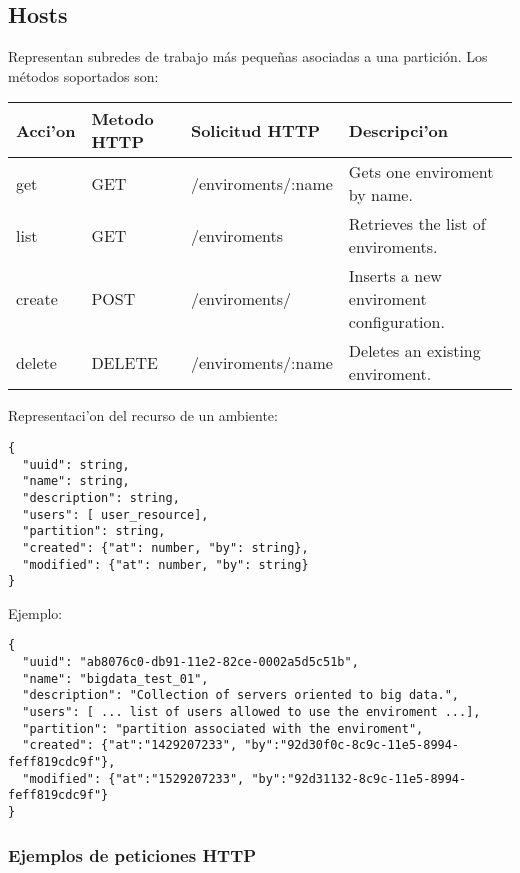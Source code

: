 \subsection{Hosts}
Representan subredes de trabajo más pequeñas asociadas a una partición. Los métodos soportados son:

\begin{center}
 \begin{tabular}{| l | l | l | l |}
 \hline
  \rowcolor{blueapi}
  \textbf{Acci'on} & \textbf{Metodo HTTP} & \textbf{Solicitud HTTP} & \textbf{Descripci'on} \\ [0.5ex] 
  \hline\hline
  get & GET & /enviroments/:name & Gets one enviroment by name. \\
  \hline
  list & GET & /enviroments & Retrieves the list of enviroments. \\
  \hline  
  create & POST & /enviroments/ & Inserts a new enviroment configuration. \\
  \hline
  delete & DELETE & /enviroments/:name & Deletes an existing enviroment. \\
  \hline
\end{tabular}
\end{center}

Representaci'on del recurso de un ambiente:

\medskip
\begin{lstlisting}[style=json]
{
  "uuid": string,
  "name": string,
  "description": string, 
  "users": [ user_resource],
  "partition": string,
  "created": {"at": number, "by": string},
  "modified": {"at": number, "by": string}
}
\end{lstlisting}

Ejemplo:

\medskip
\begin{lstlisting}[style=json]
{
  "uuid": "ab8076c0-db91-11e2-82ce-0002a5d5c51b",
  "name": "bigdata_test_01",
  "description": "Collection of servers oriented to big data.", 
  "users": [ ... list of users allowed to use the enviroment ...],
  "partition": "partition associated with the enviroment",
  "created": {"at":"1429207233", "by":"92d30f0c-8c9c-11e5-8994-feff819cdc9f"},
  "modified": {"at":"1529207233", "by":"92d31132-8c9c-11e5-8994-feff819cdc9f"}
}
\end{lstlisting}

\subsubsection{Ejemplos de peticiones HTTP}

